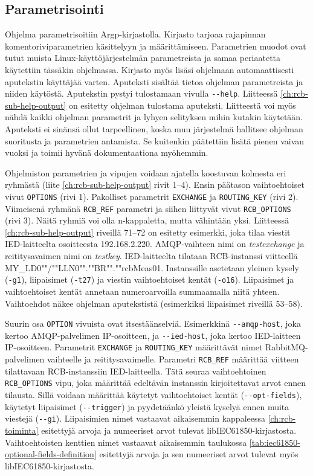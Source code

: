 \subsection{Parametrisointi}
Ohjelma parametrisoitiin Argp-kirjastolla. Kirjasto tarjoaa rajapinnan komentoriviparametrien käsittelyyn ja määrittämiseen. Parametrien muodot ovat tutut muista Linux-käyt\-tö\-jär\-jes\-tel\-män parametreista ja samaa periaatetta käytettiin tässäkin ohjelmassa. Kirjasto myös lisäsi ohjelmaan automaattisesti aputekstin käyttäjää varten. Aputeksti sisältää tietoa ohjelman parametreista ja niiden käytöstä. Aputekstin pystyi tulostamaan vivulla \texttt{-{}-help}. Liitteessä \ref{ch:rcb-sub-help-output} on esitetty ohjelman tulostama aputeksti. Liitteestä voi myös nähdä kaikki ohjelman parametrit ja lyhyen selityksen mihin kutakin käytetään. Aputeksti ei sinänsä ollut tarpeellinen, koska muu järjestelmä hallitsee ohjelman suoritusta ja parametrien antamista. Se kuitenkin päätettiin lisätä pienen vaivan vuoksi ja toimii hyvänä dokumentaationa myöhemmin.

Ohjelmiston parametrien ja vipujen voidaan ajatella koostuvan kolmesta eri ryhmästä (liite \ref{ch:rcb-sub-help-output} rivit 1--4). Ensin päätason vaihtoehtoiset vivut \texttt{OPTIONS} (rivi 1). Pakolliset parametrit \texttt{EXCHANGE} ja \texttt{ROUTING\_KEY} (rivi 2). Viimeisenä ryhmänä \texttt{RCB\_REF} parametri ja siihen liittyvät vivut \texttt{RCB\_OPTIONS} (rivi 3). Näitä ryhmiä voi olla n-kappaletta, mutta vähintään yksi. Liitteessä \ref{ch:rcb-sub-help-output} riveillä 71--72 on esitetty esimerkki, joka tilaa viestit IED-laitteelta osoitteesta 192.168.2.220. AMQP-vaihteen nimi on \emph{testexchange} ja reititysavaimen nimi on \emph{testkey}. IED-laitteelta tilataan RCB-instanssi viitteellä MY\_LD0""/""LLN0"".""BR"".""rcbMeas01. Instanssille asetetaan yleinen kysely (\texttt{-g1}), liipaisimet (\texttt{-t27}) ja viestin vaihtoehtoiset kentät (\texttt{-o16}). Liipaisimet ja vaihtoehtoiset kentät annetaan numeroarvoilla summaamalla niitä yhteen. Vaihtoehdot näkee ohjelman aputekstistä (esimerkiksi liipaisimet riveillä 53--58).

Suurin osa \texttt{OPTION} vivuista ovat itsestäänselviä. Esimerkkinä \texttt{-{}-amqp-host}, joka kertoo AMQP-pal\-ve\-li\-men IP-osoitteen, ja \texttt{-{}-ied-host}, joka kertoo IED-laitteen IP-osoitteen. Parametrit \texttt{EXCHANGE} ja \texttt{ROUTING\_KEY} määrittävät nimet RabbitMQ-pal\-ve\-li\-men vaihteelle ja reititysavaimelle. Parametri \texttt{RCB\_REF} määrittää viitteen tilattavaan RCB-instanssiin IED-laitteella. Tätä seuraa vaihtoehtoinen \texttt{RCB\_OPTIONS} vipu, joka määrittää edeltävän instanssin kirjoitettavat arvot ennen tilausta. Sillä voidaan määrittää käytetyt vaihtoehtoiset kentät (\texttt{-{}-opt-fields}), käytetyt liipaisimet (\texttt{-{}-trigger}) ja pyydetäänkö yleistä kyselyä ennen muita viestejä (\texttt{-{}-gi}). Liipaisimien nimet vastaavat aikaisemmin kappaleessa \ref{ch:rcb-toiminta} esitettyjä arvoja ja numeeriset arvot tulevat libIEC61850-kirjastosta. Vaihtoehtoisten kenttien nimet vastaavat aikaisemmin taulukossa \ref{tab:iec61850-optional-fields-definition} esitettyjä arvoja ja sen numeeriset arvot tulevat myös libIEC61850-kirjastosta.

